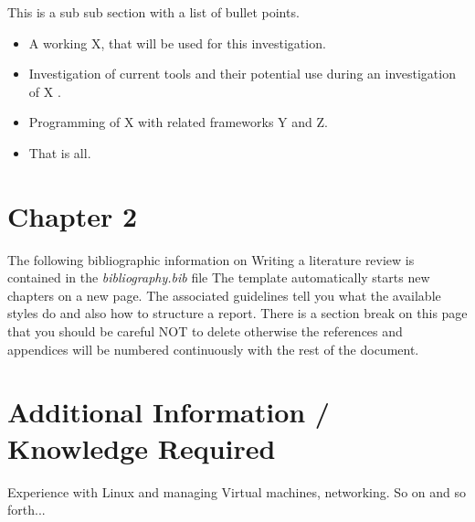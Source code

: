 \documentclass[12pt,a4paper]{article}
\begin{document}
This is a sub sub section with a list of bullet points.
\begin{itemize}\itemsep0pt
	\item A working X, that will be used for this investigation.
	\item Investigation of current tools and their potential use during an investigation of X .
	\item Programming of X with related frameworks Y and Z.
	\item That is all.
\end{itemize}


\section{Chapter 2}
The following bibliographic information on Writing a literature review is contained in the \emph{bibliography.bib} file \cite{randolph2009guide} 
The template automatically starts new chapters on a new page.  The associated guidelines tell you what the available styles do and also how to structure a report.
There is a section break on this page that you should be careful NOT to delete otherwise the references and appendices will be numbered continuously with the rest of the document.

\section{Additional Information / Knowledge Required}
Experience with Linux and managing Virtual machines, networking.
So on and so forth...




\end{document}
